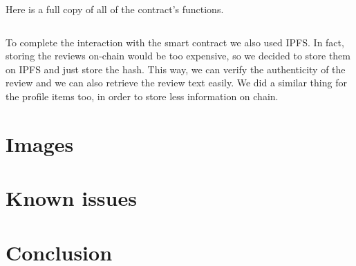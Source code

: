 \documentclass[12pt,a4paper,oneside]{article}
\theoremstyle{definition}
\begin{document}
Here is a full copy of all of the contract's functions.

\inputminted{Solidity}{Derp.sol}

To complete the interaction with the smart contract we also used IPFS. In fact, storing the reviews on-chain would be too expensive, so we decided to store them on IPFS and just store the hash. This way, we can verify the authenticity of the review and we can also retrieve the review text easily. We did a similar thing for the profile items too, in order to store less information on chain. \\

\section{Images} %

\section{Known issues}


\section{Conclusion}

\newpage
\end{document}
